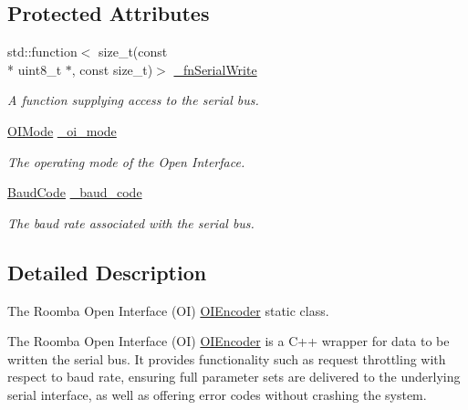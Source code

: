 \subsection*{Protected Attributes}
\begin{DoxyCompactItemize}
\item 
std\+::function$<$ size\+\_\+t(const \\*
uint8\+\_\+t $\ast$, const size\+\_\+t)$>$ \hyperlink{classroomba_1_1series500_1_1oi_1_1_o_i_encoder_adea2ff25939589efd18d0ae64b14049b}{\+\_\+fn\+Serial\+Write}
\begin{DoxyCompactList}\small\item\em A function supplying access to the serial bus. \end{DoxyCompactList}\item 
\hyperlink{namespaceroomba_1_1series500_1_1oi_a8dde6b4ac23e862ae50868c3963d7063}{O\+I\+Mode} \hyperlink{classroomba_1_1series500_1_1oi_1_1_o_i_encoder_a22983349615457194a9714375f391b8b}{\+\_\+oi\+\_\+mode}
\begin{DoxyCompactList}\small\item\em The operating mode of the Open Interface. \end{DoxyCompactList}\item 
\hyperlink{namespaceroomba_1_1series500_1_1oi_ae5028fe52e1dabe309aff04a45581bfd}{Baud\+Code} \hyperlink{classroomba_1_1series500_1_1oi_1_1_o_i_encoder_a5bcaee2d98338552fa1434baf1bbeef2}{\+\_\+baud\+\_\+code}
\begin{DoxyCompactList}\small\item\em The baud rate associated with the serial bus. \end{DoxyCompactList}\end{DoxyCompactItemize}


\subsection{Detailed Description}
The Roomba Open Interface (O\+I) \hyperlink{classroomba_1_1series500_1_1oi_1_1_o_i_encoder}{O\+I\+Encoder} static class. 

The Roomba Open Interface (O\+I) \hyperlink{classroomba_1_1series500_1_1oi_1_1_o_i_encoder}{O\+I\+Encoder} is a C++ wrapper for data to be written the serial bus. It provides functionality such as request throttling with respect to baud rate, ensuring full parameter sets are delivered to the underlying serial interface, as well as offering error codes without crashing the system. 

